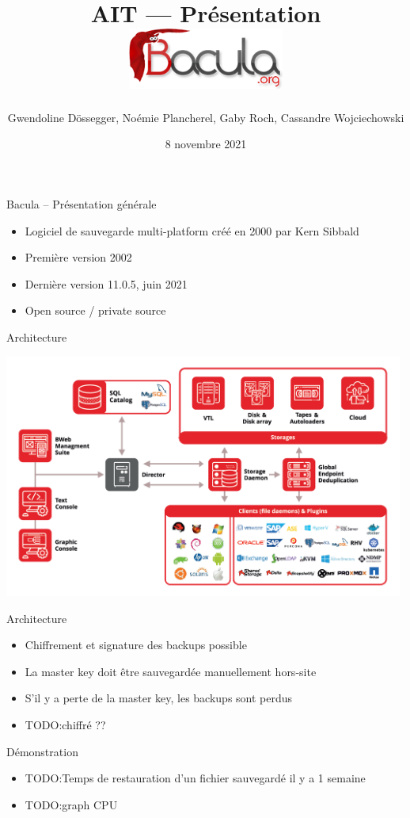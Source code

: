 \documentclass[aspectratio=169]{beamer}
\title{
    AIT --- Présentation \\
    \centering\includegraphics [height=20mm] {logo_bacula.png} 
}
\author{Gwendoline Dössegger, Noémie Plancherel, Gaby Roch, Cassandre Wojciechowski}
\date{8 novembre 2021}
\newcommand{\TODO}{TODO:}
\begin{document}
\begin{frame}
  \titlepage
\end{frame}

\begin{frame}{Bacula -- Présentation générale}
 \begin{itemize}
  \item Logiciel de sauvegarde multi-platform créé en 2000 par Kern Sibbald
  \item Première version 2002
  \item Dernière version 11.0.5, juin 2021
  \item Open source / private source %
 \end{itemize}
\end{frame}

\begin{frame}{Architecture}
  \begin{center}
    \includegraphics[height=80mm]{architecture.png}
  \end{center}  
\end{frame}

\begin{frame}{Architecture}
 \begin{itemize}
  \item Chiffrement et signature des backups possible
  \item La master key doit être sauvegardée manuellement hors-site
  \item S'il y a perte de la master key, les backups sont perdus
  \item \TODO chiffré ??
 \end{itemize}
\end{frame}

\begin{frame}{Démonstration}
 \begin{itemize}
  \item \TODO Temps de restauration d'un fichier sauvegardé il y a 1 semaine
  \item \TODO graph CPU
 \end{itemize}
\end{frame}
\end{document}
